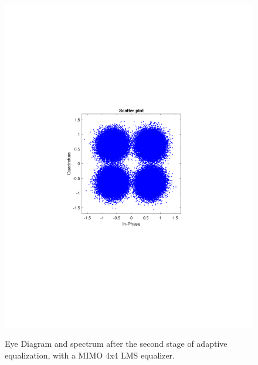 \begin{refsection}
\begin{figure}[H]
\begin{minipage}{0.30\textwidth}
		\includegraphics[clip, trim=4cm 8cm 4cm 8cm, width=1\textwidth]{./sdf/m_qam_system/figures/expResults/homodyne/5_const_16GBdInSig13dB_AfMIMO2.pdf}
		\label{fig:16GBdSpecBefFec}
	\end{minipage}
	\caption{Eye Diagram and spectrum after the second stage of adaptive equalization, with a MIMO 4x4 LMS equalizer.}
\end{figure}


\end{refsection}
